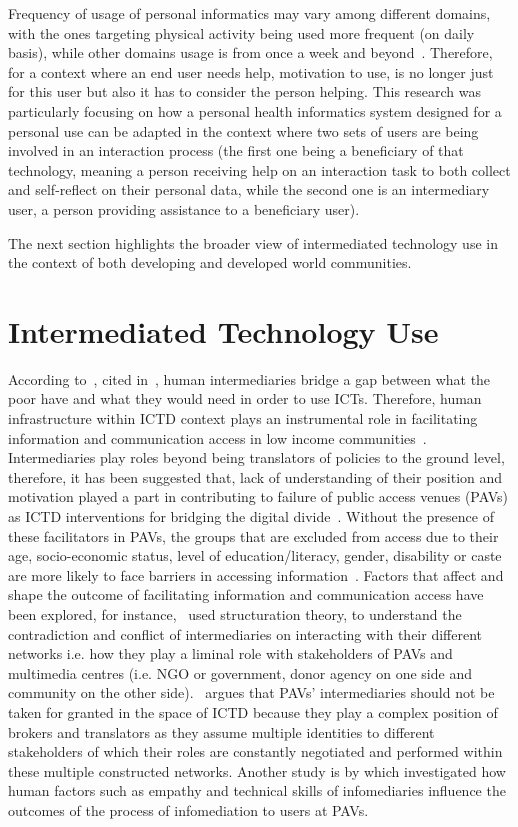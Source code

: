 Frequency of usage of personal informatics may vary among different domains, with the ones targeting physical activity being used more frequent (on daily basis), while other domains usage is from once a week and beyond~\citep{epstein2015lived}. Therefore, for a context where an end user needs help, motivation to use, is no longer just for this user but also it has to consider the person helping. This research was particularly focusing on how a personal health informatics system  designed for a personal use can be adapted in the context where two sets of users are being involved in an interaction process (the first one being a beneficiary of that technology, meaning a person receiving help on an interaction task to both collect and self-reflect on their personal data, while the second one is an intermediary user, a person providing assistance to a beneficiary user).

The next section highlights the broader view of intermediated technology use in the context of both developing and developed world communities.  

\section{Intermediated Technology Use}
According to~\cite{heeks1999tyranny}, cited in~\cite{bailur2012complex}, human intermediaries bridge a gap between what the poor have and what they would need in order to use ICTs. Therefore, human infrastructure within ICTD context plays an instrumental role in facilitating information and communication access in low income communities~\citep{sambasivan2010human}. Intermediaries play roles beyond being translators of policies to the ground level, therefore, it has been suggested that, lack of understanding of their position and motivation played a part in contributing to failure of public access venues (PAVs) as ICTD interventions for bridging the digital divide~\citep{bailur2010liminal}. Without the presence of these facilitators in PAVs, the groups that are excluded from access due to their age, socio-economic status, level of education/literacy, gender, disability or caste are more likely to face barriers in accessing information~\citep{ramirez2013infomediaries}. Factors that affect and shape the outcome of facilitating information and communication access have been explored, for instance,~\cite{bailur2010liminal} used structuration theory\citep{jones2008giddens}, to understand the contradiction and conflict of intermediaries on interacting with their different networks i.e. how they play a liminal role with stakeholders of PAVs and multimedia centres (i.e. NGO or government, donor agency on one side and community on the other side).~\cite{bailur2012complex} argues that PAVs' intermediaries should not be taken for granted in the space of ICTD because they play a complex position of brokers and translators as they assume multiple identities to different stakeholders of which their roles are constantly negotiated and performed within these multiple constructed networks. Another study is by \cite{ramirez2013infomediaries} which investigated how human factors such as empathy and technical skills of infomediaries influence the outcomes of the process of infomediation to users at PAVs. 

